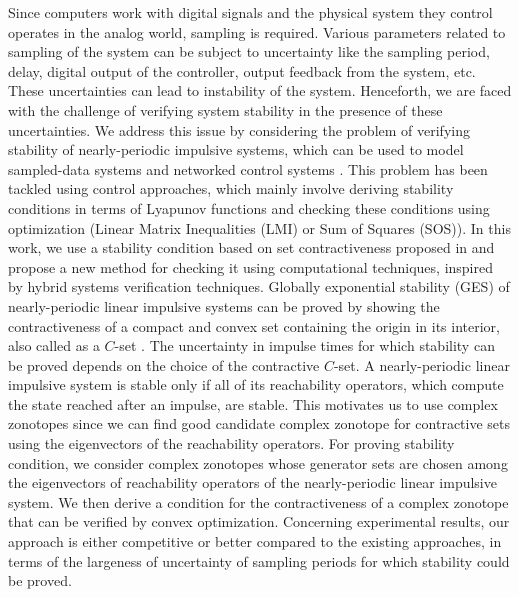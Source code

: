 

    Since computers work with digital signals and the physical system
    they control operates in the analog world, sampling is required.
    Various parameters related to sampling of the system can be
    subject to uncertainty like the sampling period, delay, digital
    output of the controller, output feedback from the system, etc.
    These uncertainties can lead to instability of the system.
    Henceforth, we are faced with the challenge of verifying system
    stability in the presence of these uncertainties.  We address this
    issue by considering the problem of verifying stability of
    nearly-periodic impulsive systems, which can be used to model
    sampled-data systems \cite{naghshtabrizi2007delay} and networked
    control systems \cite{2008-naghshtabrizi-exponential}.  This
    problem has been tackled using control approaches, which mainly
    involve deriving stability conditions in terms of Lyapunov
    functions and checking these conditions using optimization (Linear
    Matrix Inequalities (LMI) or Sum of Squares (SOS)). In this work,
    we use a stability condition based on set contractiveness proposed
    in
    \cite{athanasopoulos2014alternative,2014-fiacchini-set,AlKhatib2015}
    and propose a new method for checking it using computational
    techniques, inspired by hybrid systems verification
    techniques. Globally exponential stability (GES) of
    nearly-periodic linear impulsive systems can be proved by showing
    the contractiveness of a compact and convex set containing the
    origin in its interior, also called as a $C$-set
    \cite{Lazar2013,athanasopoulos2014alternative,2014-fiacchini-set,AlKhatib2015}.
    The uncertainty in impulse times for which stability can be proved
    depends on the choice of the contractive $C$-set.  A
    nearly-periodic linear impulsive system is stable only if all of
    its reachability operators, which compute the state reached after
    an impulse, are stable.  This motivates us to use complex
    zonotopes since we can find good candidate complex zonotope for
    contractive sets using the eigenvectors of the reachability
    operators.  For proving stability condition, we consider complex
    zonotopes whose generator sets are chosen among the eigenvectors
    of reachability operators of the nearly-periodic linear impulsive
    system.  We then derive a condition for the contractiveness of a
    complex zonotope that can be verified by convex optimization.
    Concerning experimental results, our approach is either
    competitive or better compared to the existing approaches, in
    terms of the largeness of uncertainty of sampling periods for
    which stability could be proved.

